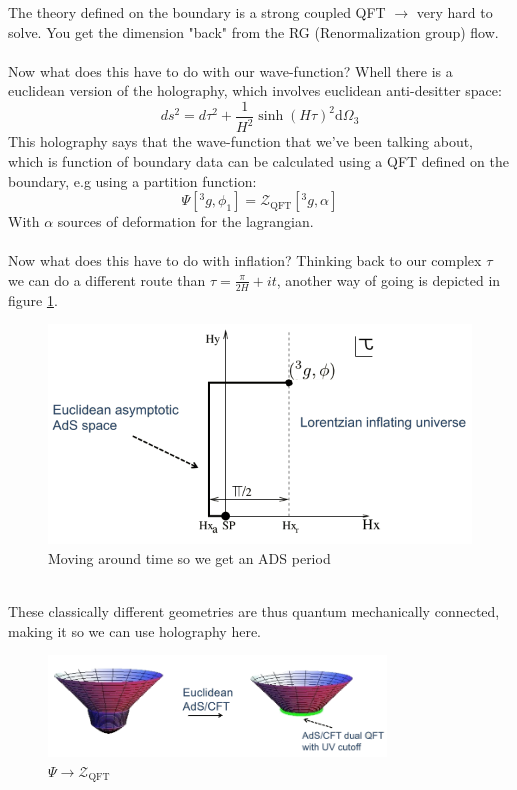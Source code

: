 \documentclass{article}
\begin{document}
  The theory defined on the boundary is a strong coupled QFT $\rightarrow$ very hard to solve. You get the dimension "back" from the RG (Renormalization group) flow. \\\\
  Now what does this have to do with our wave-function? Whell there is a euclidean version of the holography, which involves euclidean anti-desitter space:
  \begin{equation}
    ds^2 = d\tau^2 + \frac{1}{H^2}\sinh(H\tau)^2\text{d}\Omega_3
  \end{equation}
  This holography says that the wave-function that we've been talking about, which is function of boundary data can be calculated using a QFT defined on the boundary, e.g using a partition function:
  \begin{equation}
    \Psi[^3g,\phi_1] = \mathcal{Z}_{\text{QFT}}[^3g,\alpha]
  \end{equation}
  With $\alpha$ sources of deformation for the lagrangian.\\\\
  Now what does this have to do with inflation? Thinking back to our complex $\tau$ we can do a different route than $\tau = \frac{\pi}{2H} + it$, another way of going is depicted in figure \ref{fig:ADS}.
  \begin{figure}[h]
    \centering
    \includegraphics[scale=0.5]{ADS.png}
    \caption{Moving around time so we get an ADS period}
    \label{fig:ADS}
  \end{figure}\\
  These classically different geometries are thus quantum mechanically connected, making it so we can use holography here.
  \begin{figure}
    \centering
    \includegraphics[width=0.8\textwidth]{ADSCFTdual.png}
    \caption{$\Psi \rightarrow \mathcal{Z}_{\text{QFT}}$}
    \label{fig:ridofads}
  \end{figure}
\end{document}
